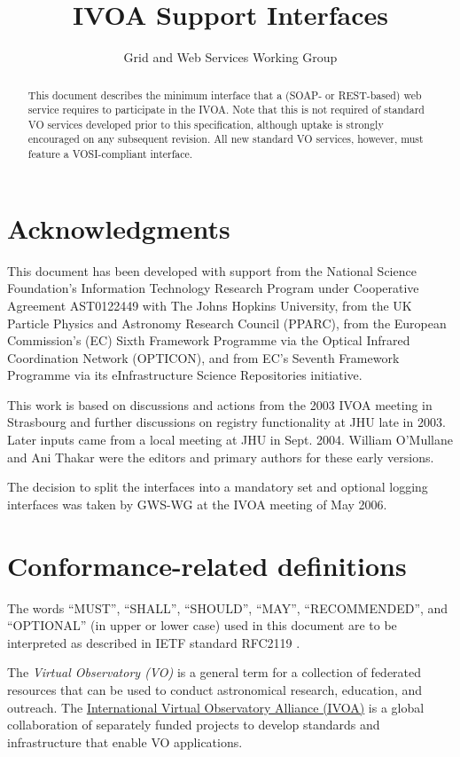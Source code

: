 \documentclass[11pt,letter]{ivoa}
\title{IVOA Support Interfaces}
\author{Grid and Web Services Working Group}
\begin{document}
\begin{abstract}
This document describes the minimum interface that a (SOAP- or REST-based) web service requires to participate in the IVOA. Note that this is not required of standard VO services developed prior to this specification, although uptake is strongly encouraged on any subsequent revision. All new standard VO services, however, must feature a VOSI-compliant interface. 
\end{abstract}


\section*{Acknowledgments}

This document has been developed with support from the National Science Foundation's Information Technology Research Program under Cooperative Agreement AST0122449 with The Johns Hopkins University, from the UK Particle Physics and Astronomy Research Council (PPARC), from the European Commission's (EC) Sixth Framework Programme via the Optical Infrared Coordination Network (OPTICON), and from EC's Seventh Framework Programme via its eInfrastructure Science Repositories initiative.

This work is based on discussions and actions from the 2003 IVOA meeting in Strasbourg and further discussions on registry functionality at JHU late in 2003. Later inputs came from a local meeting at JHU in Sept. 2004. William O'Mullane and Ani Thakar were the editors and primary authors for these early versions.

The decision to split the interfaces into a mandatory set and optional logging interfaces was taken by GWS-WG at the IVOA meeting of May 2006. 

\section*{Conformance-related definitions}

The words ``MUST'', ``SHALL'', ``SHOULD'', ``MAY'', ``RECOMMENDED'', and
``OPTIONAL'' (in upper or lower case) used in this document are to be
interpreted as described in IETF standard RFC2119 \citep{std:RFC2119}.

The \emph{Virtual Observatory (VO)} is a
general term for a collection of federated resources that can be used
to conduct astronomical research, education, and outreach.
The \href{http://www.ivoa.net}{International
Virtual Observatory Alliance (IVOA)} is a global
collaboration of separately funded projects to develop standards and
infrastructure that enable VO applications.
\end{document}
